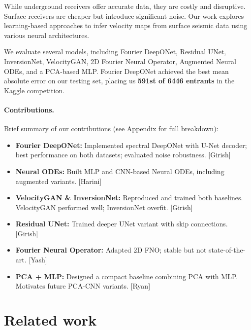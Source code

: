 \documentclass{article}
\newcommand{\instructions}[1]{{\color{blue} #1}}
\begin{document}
While underground receivers offer accurate data, they are costly and disruptive. Surface receivers are cheaper but introduce significant noise. Our work explores learning-based approaches to infer velocity maps from surface seismic data using various neural architectures.

We evaluate several models, including Fourier DeepONet, Residual UNet, InversionNet, VelocityGAN, 2D Fourier Neural Operator, Augmented Neural ODEs, and a PCA-based MLP. Fourier DeepONet achieved the best mean absolute error on our testing set, placing us \textbf{591st of 6446 entrants} in the Kaggle competition.

\paragraph{Contributions.}
Brief summary of our contributions (see Appendix for full breakdown):

\begin{itemize}[leftmargin=1.2em, itemsep=0.4em]
    \item \textbf{Fourier DeepONet:} Implemented spectral DeepONet with U-Net decoder; best performance on both datasets; evaluated noise robustness. [Girish]
    \item \textbf{Neural ODEs:} Built MLP and CNN-based Neural ODEs, including augmented variants. [Harini]
    \item \textbf{VelocityGAN \& InversionNet:} Reproduced and trained both baselines. VelocityGAN performed well; InversionNet overfit. [Girish]
    \item \textbf{Residual UNet:} Trained deeper UNet variant with skip connections. [Girish]
    \item \textbf{Fourier Neural Operator:} Adapted 2D FNO; stable but not state-of-the-art. [Yash]
    \item \textbf{PCA + MLP:} Designed a compact baseline combining PCA with MLP. Motivates future PCA-CNN variants. [Ryan]
\end{itemize}

\section{Related work} 
\end{document}
